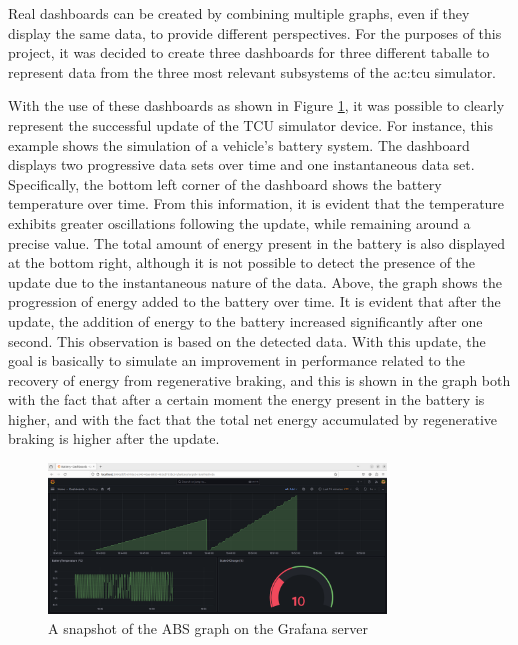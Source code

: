 Real dashboards can be created by combining multiple graphs, even if they display the same data, to provide different perspectives. For the purposes of this project, it was decided to create three dashboards for three different taballe to represent data from the three most relevant subsystems of the \gls{ac:tcu} simulator. 

With the use of these dashboards as shown in Figure \ref{fig:GrafanaABS}, it was possible to clearly represent the successful update of the TCU simulator device. For instance, this example shows the simulation of a vehicle's battery system. The dashboard displays two progressive data sets over time and one instantaneous data set. Specifically, the bottom left corner of the dashboard shows the battery temperature over time. From this information, it is evident that the temperature exhibits greater oscillations following the update, while remaining around a precise value. The total amount of energy present in the battery is also displayed at the bottom right, although it is not possible to detect the presence of the update due to the instantaneous nature of the data. Above, the graph shows the progression of energy added to the battery over time. It is evident that after the update, the addition of energy to the battery increased significantly after one second. This observation is based on the detected data. With this update, the goal is basically to simulate an improvement in performance related to the recovery of energy from regenerative braking, and this is shown in the graph both with the fact that after a certain moment the energy present in the battery is higher, and with the fact that the total net energy accumulated by regenerative braking is higher after the update.
\begin{figure}[h]  %
    \centering
    \includegraphics[width=0.8\textwidth]{images/grafana_Battery.png}  %
    \caption{A snapshot of the ABS graph on the Grafana server}
    \label{fig:GrafanaABS}
\end{figure}

